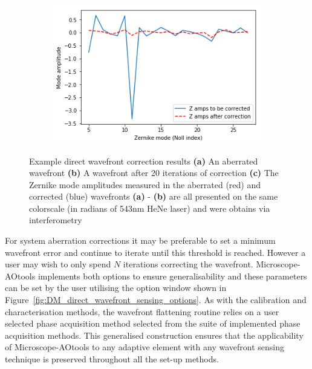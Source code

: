 \begin{figure}[h]
	\begin{subfigure}{0.55\textwidth}
		\centering
		\includegraphics[width=1\linewidth, scale=1]{./images/Zernike_modes_before_after_correction_only_corrected.png}
		\caption{}
		\label{fig:zernike_modes_to_show_flattening}
	\end{subfigure}
	\caption[Example direct wavefront correction results]{Example direct wavefront correction results \textbf{(a)} An aberrated wavefront \textbf{(b)} A wavefront after 20 iterations of correction \textbf{(c)} The Zernike mode amplitudes measured in the aberrated (red) and corrected (blue) wavefronts \textbf{(a)} - \textbf{(b)} are all presented on the same colorscale (in radians of 543nm HeNe laser) and were obtains via interferometry}
	\label{fig:direct_wavefront_correction}
\end{figure}

For system aberration corrections it may be preferable to set a minimum wavefront error and continue to iterate until this threshold is reached. However a user may wish to only spend $N$ iterations correcting the wavefront. Microscope-AOtools implements both options to ensure generalisability and these parameters can be set by the user utilising the option window shown in Figure~\ref{fig:DM_direct_wavefront_sensing_options}. As with the calibration and characterisation methods, the wavefront flattening routine relies on a user selected phase acquisition method selected from the suite of implemented phase acquisition methods. This generalised construction ensures that the applicability of Microscope-AOtools to any adaptive element with any wavefront sensing technique is preserved throughout all the set-up methods.

